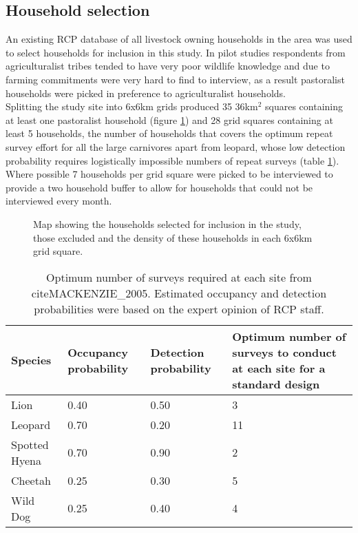 \subsection{Household selection}

An existing RCP database of all livestock owning households in the area was used to select households for inclusion in this study. In pilot studies respondents from agriculturalist tribes tended to have very poor wildlife knowledge and due to farming commitments were very hard to find to interview, as a result pastoralist households were picked in preference to agriculturalist households.\\

Splitting the study site into 6x6km grids produced 35 36km$^2$ squares containing at least one pastoralist household (figure \ref{fig:HH_selection}) and 28 grid squares containing at least 5 households, the number of households that covers the optimum repeat survey effort for all the large carnivores apart from leopard, whose low detection probability requires logistically impossible numbers of repeat surveys (table \ref{table:OptimumRepeats}). Where possible 7 households per grid square were picked to be interviewed to provide a two household buffer to allow for households that could not be interviewed every month.\\

\begin{figure}[h]
\centering
\setlength\fboxsep{0pt}
\setlength\fboxrule{0.5pt}
\caption{Map showing the households selected for inclusion in the study, those excluded and the density of these households in each 6x6km grid square.}
\label{fig:HH_selection}
\end{figure}

\begin{table}[h]
	\small
	\begin{center}
		\begin{tabular}{l p{3cm} p{3cm} p{5cm}}
			\hline \hline		
			Species 			& Occupancy probability	 	& Detection probability & Optimum number of surveys to conduct at each site for a standard design \cite{MACKENZIE_2005}\\ \hline
			Lion 		& 0.40						& 0.50 & 3\\
			Leopard 	& 0.70						& 0.20 & 11\\
			Spotted 
			Hyena       & 0.70						& 0.90 & 2\\
			Cheetah 	& 0.25						& 0.30 & 5\\
			Wild Dog 	& 0.25						& 0.40 & 4\\
			\hline \hline						
		\end{tabular}
		\caption{Optimum number of surveys required at each site from \\cite{MACKENZIE_2005}. Estimated occupancy and detection probabilities were based on the expert opinion of RCP staff.}
		\label{table:OptimumRepeats}
	\end{center}
\end{table}

